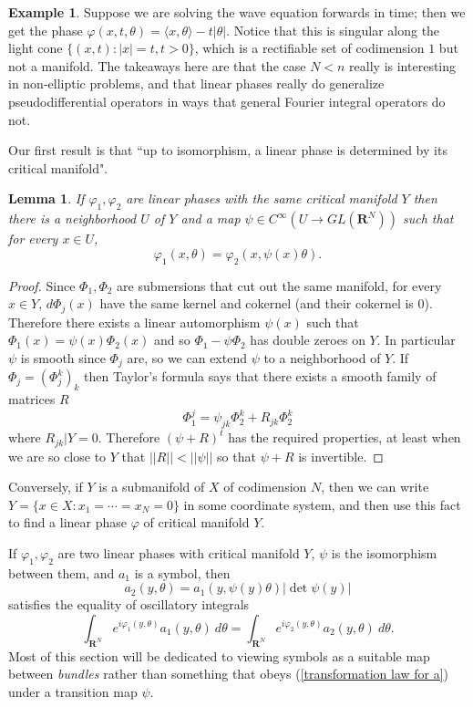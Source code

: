 \documentclass[reqno,12pt,letterpaper]{amsart}
\newcommand{\RR}{\mathbf{R}}
\newtheorem{lemma}[theorem]{Lemma}
\theoremstyle{definition}
\newtheorem{example}[theorem]{Example}
\begin{document}
\begin{example}
Suppose we are solving the wave equation forwards in time; then we get the phase $\varphi(x, t, \theta) = \langle x,\theta\rangle - t|\theta|$.
Notice that this is singular along the light cone $\{(x, t): |x| = t, t > 0\}$, which is a rectifiable set of codimension $1$ but not a manifold.
The takeaways here are that the case $N < n$ really is interesting in non-elliptic problems, and that linear phases really do generalize pseudodifferential operators in ways that general Fourier integral operators do not.
\end{example}

Our first result is that ``up to isomorphism, a linear phase is determined by its critical manifold".

\begin{lemma}
If $\varphi_1,\varphi_2$ are linear phases with the same critical manifold $Y$ then there is a neighborhood $U$ of $Y$ and a map $\psi \in C^\infty(U \to GL(\RR^N))$
such that for every $x \in U$,
$$\varphi_1(x, \theta) = \varphi_2(x, \psi(x)\theta).$$
\end{lemma}
\begin{proof}
Since $\Phi_1,\Phi_2$ are submersions that cut out the same manifold, for every $x \in Y$, $d\Phi_j(x)$ have the same kernel and cokernel (and their cokernel is $0$).
Therefore there exists a linear automorphism $\psi(x)$ such that $\Phi_1(x) = \psi(x)\Phi_2(x)$ and so $\Phi_1 - \psi \Phi_2$ has double zeroes on $Y$.
In particular $\psi$ is smooth since $\Phi_j$ are, so we can extend $\psi$ to a neighborhood of $Y$.
If $\Phi_j = (\Phi_j^k)_k$ then Taylor's formula says that there exists a smooth family of matrices $R$
$$\Phi_1^j = \psi_{jk}\Phi_2^k + R_{jk}\Phi_2^k$$
where $R_{jk}|Y = 0$. Therefore $(\psi + R)^t$ has the required properties, at least when we are so close to $Y$ that $||R|| < ||\psi||$ so that $\psi + R$ is invertible.
\end{proof}

Conversely, if $Y$ is a submanifold of $X$ of codimension $N$, then we can write $Y = \{x \in X: x_1 = \cdots = x_N = 0\}$ in some coordinate system, and then use this fact to find a linear phase $\varphi$ of critical manifold $Y$.

If $\varphi_1, \varphi_2$ are two linear phases with critical manifold $Y$, $\psi$ is the isomorphism between them, and $a_1$ is a symbol, then
\begin{equation}
\label{transformation law for a}
a_2(y, \theta) = a_1(y, \psi(y)\theta) |\det \psi(y)|
\end{equation}
satisfies the equality of oscillatory integrals
$$\int_{\RR^N} e^{i\varphi_1(y, \theta)} a_1(y, \theta) ~d\theta = \int_{\RR^N} e^{i\varphi_2(y, \theta)} a_2(y, \theta) ~d\theta.$$
Most of this section will be dedicated to viewing symbols as a suitable map between \emph{bundles} rather than something that obeys (\ref{transformation law for a}) under a transition map $\psi$.
\end{document}
